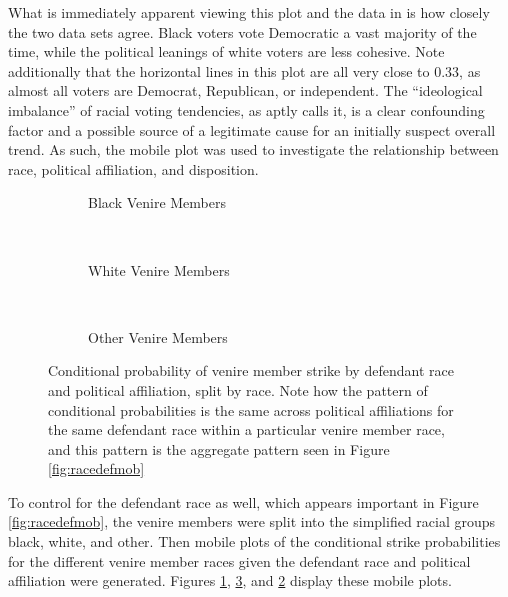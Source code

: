 What is immediately apparent viewing this plot and the data in \cite{revesz2016} is how closely the two data sets agree. Black
voters vote Democratic a vast majority of the time, while the political leanings of white voters are less cohesive. Note
additionally that the horizontal lines in this plot are all very close to 0.33, as almost all voters are Democrat, Republican, or
independent. The ``ideological imbalance'' of racial voting tendencies, as \citeauthor{revesz2016} aptly calls it, is a clear
confounding factor and a possible source of a legitimate cause for an initially suspect overall trend. As such, the mobile plot
was used to investigate the relationship between race, political affiliation, and disposition.

\begin{figure}[h!]
  \centering
  \begin{subfigure}{0.40\textwidth}
    \caption{\footnotesize Black Venire Members}
    \label{fig:blackdefpol}
  \end{subfigure}
  ~
  \begin{subfigure}{0.40\textwidth}
    \caption{\footnotesize White Venire Members}
    \label{fig:whitedefpol}
  \end{subfigure}
  ~
  \begin{subfigure}{0.40\textwidth}
    \caption{\footnotesize Other Venire Members}
    \label{fig:otherdefpol}
  \end{subfigure}
  \caption[Strikes by Political Affiliation, Race, and Defendant Race (Sunshine)]
  {\footnotesize Conditional probability of venire member strike by defendant race and political affiliation, split by race. Note how the
    pattern of conditional probabilities is the same across political affiliations for the same defendant race within a particular
    venire member race, and this pattern is the aggregate pattern seen in Figure \ref{fig:racedefmob}} \label{fig:racedefpol}
\end{figure}

To control for the defendant race as well, which appears important in
Figure \ref{fig:racedefmob}, the venire members were split into the simplified
racial groups black, white, and other. Then mobile plots of the conditional strike probabilities for the different venire member
races given the defendant race and political affiliation were generated. Figures \ref{fig:blackdefpol}, \ref{fig:otherdefpol}, and
\ref{fig:whitedefpol} display these mobile plots. 

